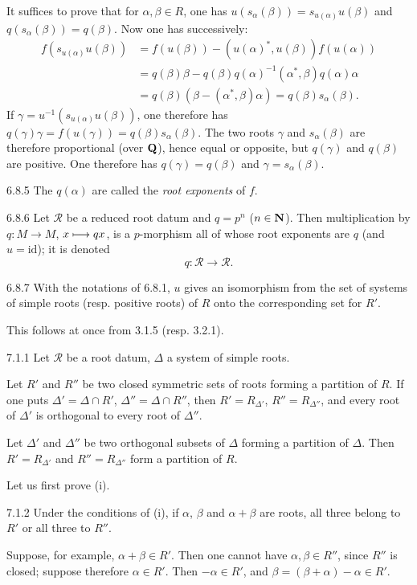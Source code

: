 It suffices to prove that for $\alpha,\beta\in R$, one has $u(s_\alpha(\beta))=s_{u(\alpha)}u(\beta)$ and $q(s_\alpha(\beta))=q(\beta)$. Now one has successively:
\[
\begin{aligned}
f(s_{u(\alpha)}u(\beta))&=f(u(\beta))-(u(\alpha)^*,u(\beta))f(u(\alpha))\\
&=q(\beta)\beta-q(\beta)q(\alpha)^{-1}(\alpha^*,\beta)q(\alpha)\alpha\\
&=q(\beta)(\beta-(\alpha^*,\beta)\alpha)=q(\beta)s_\alpha(\beta).
\end{aligned}
\]
If $\gamma=u^{-1}(s_{u(\alpha)}u(\beta))$, one therefore has $q(\gamma)\gamma=f(u(\gamma))=q(\beta)s_\alpha(\beta)$. The two roots $\gamma$ and $s_\alpha(\beta)$ are therefore proportional (over $\mathbf{Q}$), hence equal or opposite, but $q(\gamma)$ and $q(\beta)$ are positive. One therefore has $q(\gamma)=q(\beta)$ and $\gamma=s_\alpha(\beta)$.
\begin{definition}{6.8.5}\label{XXI.6.8.5}
The $q(\alpha)$ are called the \emph{root exponents} of $f$.
\end{definition}
\begin{example}{6.8.6}\label{XXI.6.8.6}
Let $\mathcal R$ be a reduced root datum and $q=p^n$ ($n\in\mathbf{N}$). Then multiplication by $q:M\to M$, $x\longmapsto qx$, is a $p$-morphism all of whose root exponents are $q$ (and $u=\mathrm{id}$); it is denoted
\[
q:\mathcal R\to\mathcal R.
\]
\end{example}
\begin{proposition}{6.8.7}\label{XXI.6.8.7}
With the notations of 6.8.1, $u$ gives an isomorphism from the set of systems of simple roots (resp. positive roots) of $R$ onto the corresponding set for $R'$.
\end{proposition}
This follows at once from 3.1.5 (resp. 3.2.1).

\label{XXI.sec.7}
\begin{proposition}{7.1.1}\label{XXI.7.1.1}
Let $\mathcal R$ be a root datum, $\Delta$ a system of simple roots.
\begin{enumeratei}
\item Let $R'$ and $R''$ be two closed symmetric sets of roots forming a partition of $R$. If one puts $\Delta'=\Delta\cap R'$, $\Delta''=\Delta\cap R''$, then $R'=R_{\Delta'}$, $R''=R_{\Delta''}$, and every root of $\Delta'$ is orthogonal to every root of $\Delta''$.
\item Let $\Delta'$ and $\Delta''$ be two orthogonal subsets of $\Delta$ forming a partition of $\Delta$. Then $R'=R_{\Delta'}$ and $R''=R_{\Delta''}$ form a partition of $R$.
\end{enumeratei}
\end{proposition}
Let us first prove (i).
\begin{lemma}{7.1.2}\label{XXI.7.1.2}
Under the conditions of (i), if $\alpha$, $\beta$ and $\alpha+\beta$ are roots, all three belong to $R'$ or all three to $R''$.
\end{lemma}
Suppose, for example, $\alpha+\beta\in R'$. Then one cannot have $\alpha,\beta\in R''$, since $R''$ is closed; suppose therefore $\alpha\in R'$. Then $-\alpha\in R'$, and $\beta=(\beta+\alpha)-\alpha\in R'$.


